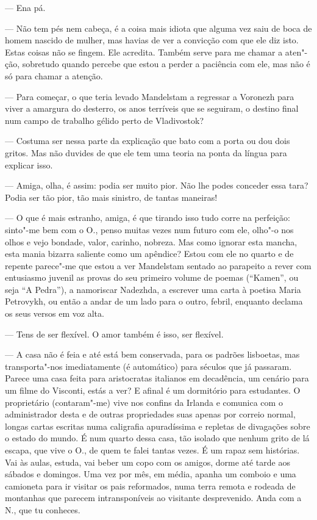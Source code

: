 --- Ena pá.

--- Não tem pés nem cabeça, é a coisa mais idiota que
alguma vez saiu de boca de homem nascido de mulher, mas havias de ver a
convicção com que ele diz isto. Estas coisas não se fingem. Ele
acredita. Também serve para me chamar a aten"- ção, sobretudo quando
percebe que estou a perder a paciência com ele, mas não é só para chamar
a atenção.

--- Para começar, o que teria levado Mandelstam a regressar a Voronezh
  para viver a amargura do desterro, os anos terríveis que se
  seguiram, o destino final num campo de trabalho gélido perto de
  Vladivostok?

--- Costuma ser nessa parte da explicação que bato com a porta ou dou dois
  gritos. Mas não duvides de que ele tem uma teoria na ponta da língua
  para explicar isso.

--- Amiga, olha, é assim: podia ser muito pior. Não lhe podes conceder
  essa tara? Podia ser tão pior, tão mais sinistro, de tantas maneiras!

--- O que é mais estranho, amiga, é que tirando isso tudo corre na
  perfeição: sinto"-me bem com o O., penso muitas vezes num futuro com
  ele, olho"-o nos olhos e vejo bondade, valor, carinho, nobreza. Mas
  como ignorar esta mancha, esta mania bizarra saliente como um
  apêndice? Estou com ele no quarto e de repente parece"-me que estou a
  ver Mandelstam sentado ao parapeito a rever com entusiasmo juvenil as
  provas do seu primeiro volume de poemas (``Kamen'', ou seja ``A
  Pedra''), a namoriscar Nadezhda, a escrever uma carta à poetisa
  Maria Petrovykh, ou então a andar de um lado para o outro, febril,
  enquanto declama os seus versos em voz alta.

--- Tens de ser flexível. O amor também é isso, ser flexível.


\medskip
\asterisc
\medskip

--- A casa não é feia e até está bem conservada, para os padrões
  lisboetas, mas transporta"-nos imediatamente (é automático) para
  séculos que já passaram. Parece uma casa feita para aristocratas
  italianos em decadência, um cenário para um filme do Visconti, estás a
  ver? E afinal é um dormitório para estudantes. O proprietário
  (contaram"-me) vive nos confins da Irlanda e comunica com o
  administrador desta e de outras propriedades suas apenas por correio
  normal, longas cartas escritas numa caligrafia apuradíssima e repletas
  de divagações sobre o estado do mundo. É num quarto dessa casa, tão
  isolado que nenhum grito de lá escapa, que vive o O., de quem te falei
  tantas vezes. É um rapaz sem histórias. Vai às aulas, estuda, vai
  beber um copo com os amigos, dorme até tarde aos sábados e domingos.
  Uma vez por mês, em média, apanha um comboio e uma camioneta para ir
  visitar os pais reformados, numa terra remota e rodeada de montanhas
  que parecem intransponíveis ao visitante desprevenido. Anda com a N.,
  que tu conheces.

